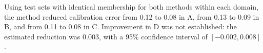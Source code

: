 Using test sets with identical membership for both methods within each domain, the method reduced calibration error from 0.12 to 0.08 in A, from 0.13 to 0.09 in B, and from 0.11 to 0.08 in C. Improvement in D was not established: the estimated reduction was 0.003, with a 95\% confidence interval of $[-0.002, 0.008]$ \cite{study2025}.
